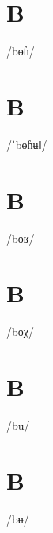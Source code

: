 \documentclass[10pt,a4paper,twoside]{book}
\begin{document}
\section*{B}

\begin{multicols}{3}
 {/bɵɦ/} {}
\end{multicols}

\section*{B}

\begin{multicols}{3}
 {/ˈbɵɦʉǁ/} {}
\end{multicols}

\section*{B}

\begin{multicols}{3}
 {/bɵʁ/} {}
\end{multicols}

\section*{B}

\begin{multicols}{3}
 {/bɵχ/} {}
\end{multicols}

\section*{B}

\begin{multicols}{3}
 {/bu/} {}
\end{multicols}

\section*{B}

\begin{multicols}{3}
 {/bʉ/} {}
\end{multicols}
\end{document}
